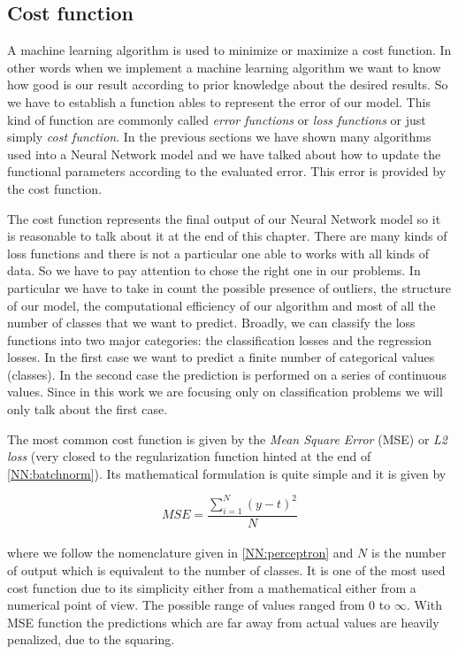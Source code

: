 \documentclass{standalone}
\begin{document}
\subsection[Cost function]{Cost function}\label{NN:cost}

A machine learning algorithm is used to minimize or maximize a cost function.
In other words when we implement a machine learning algorithm we want to know how good is our result according to prior knowledge about the desired results.
So we have to establish a function ables to represent the error of our model.
This kind of function are commonly called \emph{error functions} or \emph{loss functions} or just simply \emph{cost function}.
In the previous sections we have shown many algorithms used into a Neural Network model and we have talked about how to update the functional parameters according to the evaluated error.
This error is provided by the cost function.

The cost function represents the final output of our Neural Network model so it is reasonable to talk about it at the end of this chapter.
There are many kinds of loss functions and there is not a particular one able to works with all kinds of data.
So we have to pay attention to chose the right one in our problems.
In particular we have to take in count the possible presence of outliers, the structure of our model, the computational efficiency of our algorithm and most of all the number of classes that we want to predict.
Broadly, we can classify the loss functions into two major categories: the classification losses and the regression losses.
In the first case we want to predict a finite number of categorical values (classes).
In the second case the prediction is performed on a series of continuous values.
Since in this work we are focusing only on classification problems we will only talk about the first case.

The most common cost function is given by the \emph{Mean Square Error} (MSE) or \emph{L2 loss} (very closed to the regularization function hinted at the end of \ref{NN:batchnorm}).
Its mathematical formulation is quite simple and it is given by

$$
MSE = \frac{\sum_{i=1}^{N}\left( y - t \right)^2}{N}
$$
\\
where we follow the nomenclature given in \ref{NN:perceptron} and $N$ is the number of output which is equivalent to the number of classes.
It is one of the most used cost function due to its simplicity either from a mathematical either from a numerical point of view.
The possible range of values ranged from 0 to $\infty$.
With MSE function the predictions which are far away from actual values are heavily penalized, due to the squaring.
\end{document}
